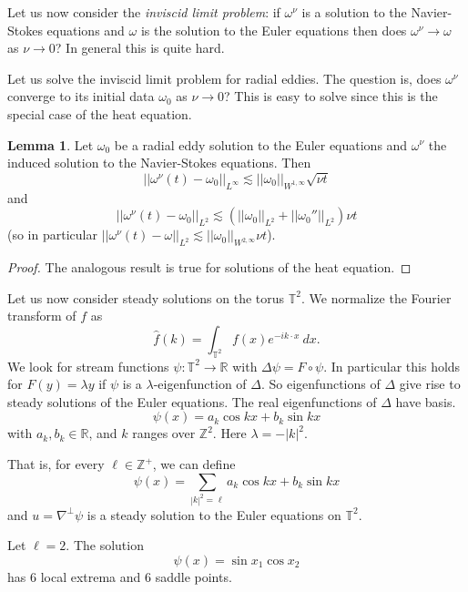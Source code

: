 \documentclass[12pt]{book}
\newcommand{\ZZ}{\mathbb{Z}}
\newcommand{\RR}{\mathbb{R}}
\newcommand{\Torus}{\mathbb{T}}
\newcommand{\dfn}[1]{\emph{#1}\index{#1}}
\theoremstyle{definition}
\newtheorem{lemma}[theorem]{Lemma}
\newenvironment{example}
  {\pushQED{\qed}\renewcommand{\qedsymbol}{$\diamondsuit$}\examplex}
  {\popQED\endexamplex}
\begin{document}
Let us now consider the \dfn{inviscid limit problem}: if $\omega^\nu$ is a solution to the Navier-Stokes equations and $\omega$ is the solution to the Euler equations then does $\omega^\nu \to \omega$ as $\nu \to 0$?
In general this is quite hard.

Let us solve the inviscid limit problem for radial eddies. The question is, does $\omega^\nu$ converge to its initial data $\omega_0$ as $\nu \to 0$?
This is easy to solve since this is the special case of the heat equation.

\begin{lemma}
Let $\omega_0$ be a radial eddy solution to the Euler equations and $\omega^\nu$ the induced solution to the Navier-Stokes equations.
Then
$$||\omega^\nu(t) - \omega_0||_{L^\infty} \lesssim ||\omega_0||_{W^{1,\infty}} \sqrt{\nu t}$$
and
$$||\omega^\nu(t) - \omega_0||_{L^2} \lesssim (||\omega_0||_{L^2} + ||\omega_0''||_{L^2}) \nu t$$
(so in particular $||\omega^\nu(t) - \omega||_{L^2} \lesssim ||\omega_0||_{W^{2,\infty}} \nu t$).
\end{lemma}
\begin{proof}
The analogous result is true for solutions of the heat equation.
\end{proof}

Let us now consider steady solutions on the torus $\Torus^2$. We normalize the Fourier transform of $f$ as
$$\hat f(k) = \int_{\Torus^2} f(x) e^{-ik\cdot x} ~dx.$$
We look for stream functions $\psi: \Torus^2 \to \RR$ with $\Delta \psi = F \circ \psi$.
In particular this holds for $F(y) = \lambda y$ if $\psi$ is a $\lambda$-eigenfunction of $\Delta$.
So eigenfunctions of $\Delta$ give rise to steady solutions of the Euler equations.
The real eigenfunctions of $\Delta$ have basis.
$$\psi(x) = a_k \cos kx + b_k \sin kx$$
with $a_k, b_k \in \RR$, and $k$ ranges over $\ZZ^2$.
Here $\lambda = -|k|^2$.

That is, for every $\ell \in \ZZ^+$, we can define
\begin{equation}
\label{torus steady stream}
\psi(x) = \sum_{|k|^2 = \ell} a_k \cos kx + b_k \sin kx
\end{equation}
and $u = \nabla^\perp \psi$ is a steady solution to the Euler equations on $\Torus^2$.

\begin{example}
Let $\ell = 2$. The solution
$$\psi(x) = \sin x_1 \cos x_2$$
has $6$ local extrema and $6$ saddle points.
\end{example}
\end{document}
